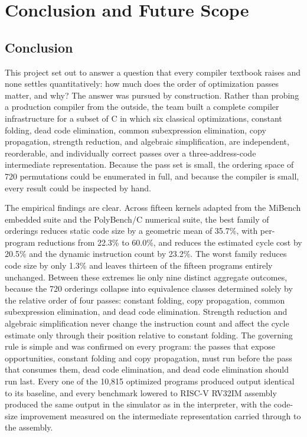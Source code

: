 \chapter{Conclusion and Future Scope}

\section{Conclusion}

This project set out to answer a question that every compiler textbook raises and none settles quantitatively: how much does the order of optimization passes matter, and why? The answer was pursued by construction. Rather than probing a production compiler from the outside, the team built a complete compiler infrastructure for a subset of C in which six classical optimizations, constant folding, dead code elimination, common subexpression elimination, copy propagation, strength reduction, and algebraic simplification, are independent, reorderable, and individually correct passes over a three-address-code intermediate representation. Because the pass set is small, the ordering space of 720 permutations could be enumerated in full, and because the compiler is small, every result could be inspected by hand.

The empirical findings are clear. Across fifteen kernels adapted from the MiBench embedded suite and the PolyBench/C numerical suite, the best family of orderings reduces static code size by a geometric mean of 35.7\%, with per-program reductions from 22.3\% to 60.0\%, and reduces the estimated cycle cost by 20.5\% and the dynamic instruction count by 23.2\%. The worst family reduces code size by only 1.3\% and leaves thirteen of the fifteen programs entirely unchanged. Between these extremes lie only nine distinct aggregate outcomes, because the 720 orderings collapse into equivalence classes determined solely by the relative order of four passes: constant folding, copy propagation, common subexpression elimination, and dead code elimination. Strength reduction and algebraic simplification never change the instruction count and affect the cycle estimate only through their position relative to constant folding. The governing rule is simple and was confirmed on every program: the passes that expose opportunities, constant folding and copy propagation, must run before the pass that consumes them, dead code elimination, and dead code elimination should run last. Every one of the 10{,}815 optimized programs produced output identical to its baseline, and every benchmark lowered to RISC-V RV32IM assembly produced the same output in the simulator as in the interpreter, with the code-size improvement measured on the intermediate representation carried through to the assembly.

